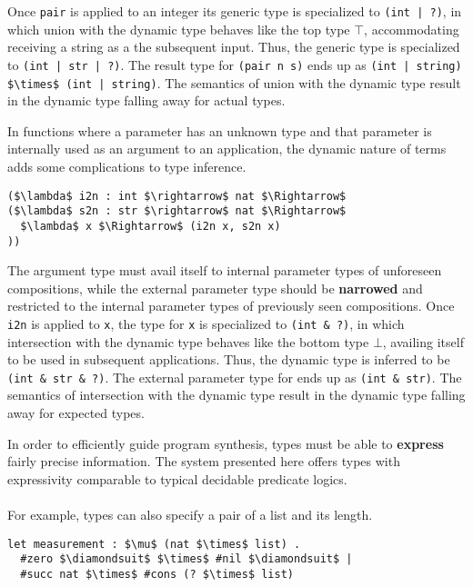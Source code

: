 \documentclass[sigplan,screen]{acmart}
\begin{document}
Once \lstinline{pair} is applied to an integer its generic type is specialized to 
\lstinline{(int | ?)}, 
in which union with the dynamic type behaves like the top type $\top$, 
accommodating receiving a string as a the subsequent input.
Thus, the generic type is specialized to \lstinline{(int | str | ?)}.
The result type for \lstinline{(pair n s)} ends up as 
\lstinline{(int | string) $\times$ (int | string)}. 
The semantics of union with the dynamic type result in the dynamic type 
falling away for actual types.

In functions where a parameter has an unknown type and that parameter is 
internally used as an argument to an application, the dynamic nature of terms  
adds some complications to type inference.

\begin{lstlisting}
($\lambda$ i2n : int $\rightarrow$ nat $\Rightarrow$ 
($\lambda$ s2n : str $\rightarrow$ nat $\Rightarrow$ 
  $\lambda$ x $\Rightarrow$ (i2n x, s2n x)
))

\end{lstlisting}

The argument type must avail itself to internal parameter types of unforeseen compositions,
while the external parameter type should be \textbf{narrowed} and restricted 
to the internal parameter types of previously seen compositions.
Once \lstinline{i2n} is applied to \lstinline{x}, 
the type for \lstinline{x} is specialized to \lstinline{(int & ?)}, 
in which intersection with the dynamic type behaves like the bottom type $\bot$,
availing itself to be used in subsequent applications. 
Thus, the dynamic type is inferred to be \lstinline{(int & str & ?)}.
The external parameter type for ends up as \lstinline{(int & str)}. 
The semantics of intersection with the dynamic type result in the dynamic type
falling away for expected types.



In order to efficiently guide program synthesis, 
types must be able to \textbf{express} fairly precise information. 
The system presented here offers types with 
expressivity comparable to typical decidable predicate logics. \\
\hfill \\
For example, types can also specify a pair of a list and its length.

\begin{lstlisting}[]
let measurement : $\mu$ (nat $\times$ list) .
  #zero $\diamondsuit$ $\times$ #nil $\diamondsuit$ | 
  #succ nat $\times$ #cons (? $\times$ list)
\end{lstlisting} 
\end{document}

